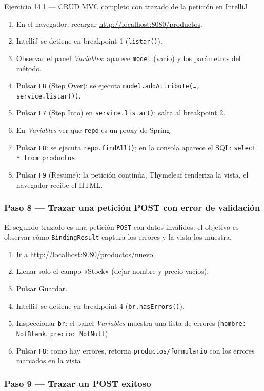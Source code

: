 \documentclass[11pt,a4paper,openany]{book}
\begin{document}
\begin{cajaejercicio}{Ejercicio 14.1 --- CRUD MVC completo con trazado de la petición en IntelliJ}
\begin{enumerate}
\item En el navegador, recargar
\url{http://localhost:8080/productos}.
\item IntelliJ se detiene en breakpoint 1 (\texttt{listar()}).
\item Observar el panel \emph{Variables}: aparece \texttt{model}
(vacío) y los parámetros del método.
\item Pulsar \texttt{F8} (Step Over): se ejecuta
\texttt{model.addAttribute(\dots, service.listar())}.
\item Pulsar \texttt{F7} (Step Into) en \texttt{service.listar()}:
salta al breakpoint 2.
\item En \emph{Variables} ver que \texttt{repo} es un proxy de Spring.
\item Pulsar \texttt{F8}: se ejecuta \texttt{repo.findAll()};
en la consola aparece el SQL: \texttt{select * from productos}.
\item Pulsar \texttt{F9} (Resume): la petición continúa, Thymeleaf
renderiza la vista, el navegador recibe el HTML.
\end{enumerate}

\subsubsection*{Paso 8 --- Trazar una petición POST con error de validación}

El segundo trazado es una petición \texttt{POST} con datos
inválidos: el objetivo es observar cómo \texttt{BindingResult}
captura los errores y la vista los muestra.


\begin{enumerate}
\item Ir a \url{http://localhost:8080/productos/nuevo}.
\item Llenar solo el campo «Stock» (dejar nombre y precio vacíos).
\item Pulsar Guardar.
\item IntelliJ se detiene en breakpoint 4 (\texttt{br.hasErrors()}).
\item Inspeccionar \texttt{br}: el panel \emph{Variables} muestra
una lista de errores (\texttt{nombre: NotBlank},
\texttt{precio: NotNull}).
\item Pulsar \texttt{F8}: como hay errores, retorna
\texttt{productos/formulario} con los errores marcados en la vista.
\end{enumerate}

\subsubsection*{Paso 9 --- Trazar un POST exitoso}


\end{cajaejercicio}
\end{document}
